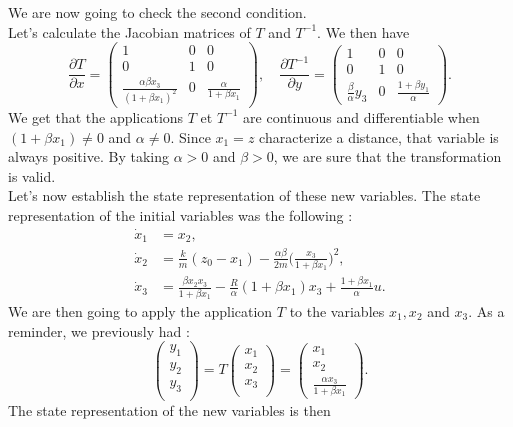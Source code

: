 We are now going to check the second condition. \\
Let's calculate the Jacobian matrices of $T$ and $T^{-1}$. We then have
$$\frac{\partial T}{\partial x} =
\begin{pmatrix}
1 & 0 & 0 \\
0 & 1 & 0 \\
\frac{\alpha \beta x_3}{(1+\beta x_1)^2} & 0 & \frac{\alpha}{1+\beta x_1}
\end{pmatrix}, \quad
\frac{\partial T^{-1}}{\partial y} =
\begin{pmatrix}
1 & 0 & 0\\
0 & 1 & 0\\
\frac{\beta}{\alpha}y_3 & 0 & \frac{1+\beta y_1}{\alpha}
\end{pmatrix}.$$
We get that the applications $T$ et $T^{-1}$ are continuous and differentiable when $(1+\beta x_1) \neq 0$ and $\alpha \neq 0$. Since $x_1 = z$ characterize a distance, that variable is always positive. By taking $\alpha > 0$ and $\beta > 0$, we are sure that the transformation is valid.\\
Let's now establish the state representation of these new variables. The state representation of the initial variables was the following :
\begin{align*}
\dot{x}_1 & = x_2, \\
\dot{x}_2 & = \frac{k}{m}(z_0-x_1)-\frac{\alpha \beta}{2m}\Big(\frac{x_3}{1+\beta x_1}\Big)^2, \\
\dot{x}_3 & = \frac{\beta x_2 x_3}{1+\beta x_1}-\frac{R}{\alpha}(1+\beta x_1)x_3 + \frac{1+\beta x_1}{\alpha}u.
\end{align*}
We are then going to apply the application $T$ to the variables $x_1,x_2$ and $x_3$. As a reminder, we previously had :
$$\begin{pmatrix}
y_1\\
y_2\\
y_3\\
\end{pmatrix}
=T
\begin{pmatrix}
x_1\\
x_2\\
x_3\\
\end{pmatrix}
=
\begin{pmatrix}
x_1 \\
x_2 \\
\frac{\alpha x_3}{1+\beta x_1}
\end{pmatrix}.$$
The state representation of the new variables is then

